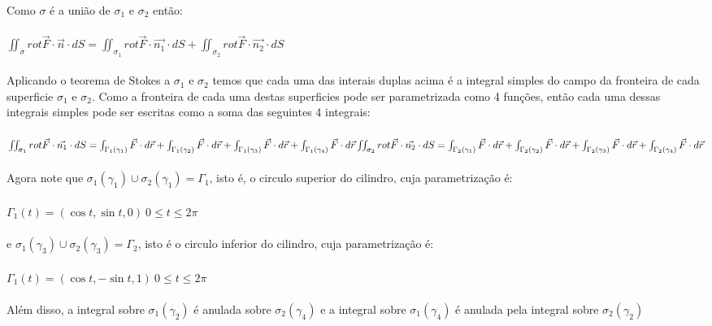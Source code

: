 \documentclass[11pt,a4paper]{article}
\begin{document}
\begin{enumerate}
{                        Como $\sigma$ é a união de $\sigma_1$ e $\sigma_2$ então: \\\\
                        $\iint_{\sigma} rot \vec{F} \cdot \vec{n} \cdot dS = \iint_{\sigma_1} rot \vec{F} \cdot \vec{n_1} \cdot dS + \iint_{\sigma_2} rot \vec{F} \cdot \vec{n_2} \cdot dS$\\\\
                        Aplicando o teorema de Stokes a $\sigma_1$ e $\sigma_2$  temos que cada uma das interais duplas acima é a integral simples do campo da fronteira  de cada superficie $\sigma_1$ e $\sigma_2$. Como a fronteira de cada uma destas superficies pode ser parametrizada como 4 funções, então cada uma dessas integrais simples pode ser escritas como a soma das seguintes 4 integrais:\\\\
                        $\iint_{\sigma_1} rot \vec{F} \cdot \vec{n_1} \cdot dS = \int_{\Gamma_{1}(\gamma_1)} \vec{F} \cdot d\vec{r} + \int_{\Gamma_{1}(\gamma_2)} \vec{F} \cdot d\vec{r} + \int_{\Gamma_{1}(\gamma_3)} \vec{F} \cdot d\vec{r} + \int_{\Gamma_{1}(\gamma_4)} \vec{F} \cdot d\vec{r}                       \\\\ \iint_{\sigma_2} rot \vec{F} \cdot \vec{n_2} \cdot dS = \int_{\Gamma_{2}(\gamma_1)} \vec{F} \cdot d\vec{r} +\int_{\Gamma_{2}(\gamma_2)} \vec{F} \cdot d\vec{r} +\int_{\Gamma_{2}(\gamma_3)} \vec{F} \cdot d\vec{r} +\int_{\Gamma_{2}(\gamma_4)} \vec{F} \cdot d\vec{r}$\\\\
                        Agora note que $\sigma_1 (\gamma_1) \cup \sigma_2 (\gamma_1) = \Gamma_1$, isto é, o circulo superior do cilindro, cuja parametrização é:\\\\
                        $\Gamma_1 (t) = (\cos t,\sin t,0)\ 0 \leq t \leq 2\pi$ \\\\
                        e $\sigma_1 (\gamma_3) \cup \sigma_2 (\gamma_3) = \Gamma_2$, isto é o circulo inferior do cilindro, cuja parametrização é: \\\\
                        $\Gamma_1 (t) = (\cos t,-\sin t,1)\ 0 \leq t \leq 2\pi$ \\\\
                        Além disso, a integral sobre $\sigma_1 (\gamma_2)$  é anulada sobre $\sigma_2 (\gamma_4)$ e a integral sobre $\sigma_1 (\gamma_4)$ é anulada pela integral sobre $\sigma_2 (\gamma_2)$\\\\
}
\end{enumerate}
\end{document}
